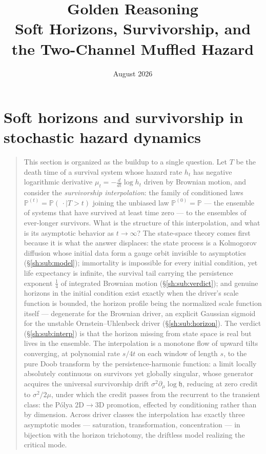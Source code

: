 \documentclass[11pt]{article}
\title{Golden Reasoning\\[4pt]
\large Soft Horizons, Survivorship, and the Two-Channel Muffled Hazard}
\author{}
\date{August 2026}
\numberwithin{equation}{section}
\theoremstyle{plain}
\theoremstyle{definition}
\theoremstyle{remark}
\newcommand{\PP}{\mathbb{P}}
\newcommand{\hm}{\mathfrak{h}}
\begin{document}
\maketitle
\tableofcontents
\bigskip

\section{Soft horizons and survivorship in stochastic hazard dynamics}\label{sh:sec}

\begin{quote}\small
This section is organized as the buildup to a single question. Let $T$ be
the death time of a survival system whose hazard rate $h_t$ has negative
logarithmic derivative $\mu_t=-\frac{d}{dt}\log h_t$ driven by Brownian
motion, and consider the \emph{survivorship interpolation}: the family of
conditioned laws $\PP^{(t)}=\PP(\,\cdot\mid T>t)$ joining the unbiased law
$\PP^{(0)}=\PP$ --- the ensemble of systems that have survived at least
time zero --- to the ensembles of ever-longer survivors. What is the
structure of this interpolation, and what is its asymptotic behavior as
$t\to\infty$? The state-space theory comes first because it is what the
answer displaces: the state process is a Kolmogorov diffusion whose
initial data form a gauge orbit invisible to asymptotics
(\S\ref{sh:sub:model}); immortality is impossible for every initial
condition, yet life expectancy is infinite, the survival tail carrying the
persistence exponent $\tfrac14$ of integrated Brownian motion
(\S\ref{sh:sub:verdict}); and genuine horizons in the initial condition
exist exactly when the driver's scale function is bounded, the horizon
profile being the normalized scale function itself --- degenerate for the
Brownian driver, an explicit Gaussian sigmoid for the unstable
Ornstein--Uhlenbeck driver (\S\ref{sh:sub:horizon}). The verdict
(\S\ref{sh:sub:interp}) is that the horizon missing from state space is
real but lives in the ensemble. The interpolation is a monotone flow of
upward tilts converging, at polynomial rate $s/4t$ on each window of
length $s$, to the pure Doob transform by the persistence-harmonic
function: a limit locally absolutely continuous on survivors yet globally
singular, whose generator acquires the universal survivorship drift
$\sigma^2\partial_\mu\log\hm$, reducing at zero credit to
$\sigma^2/2\mu$, under which the credit passes from the recurrent to the
transient class: the P\'olya $2\mathrm{D}\to3\mathrm{D}$ promotion,
effected by conditioning rather than by dimension. Across driver classes
the interpolation has
exactly three asymptotic modes --- saturation, transformation,
concentration --- in bijection with the horizon trichotomy, the driftless
model realizing the critical mode.
\end{quote}
\end{document}
